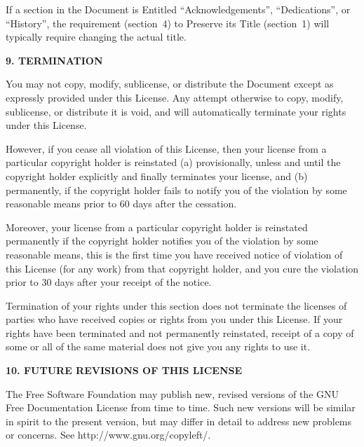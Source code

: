 \documentclass[twocolumn,twoside,fleqn,12pt]{article}
\begin{document}
If a section in the Document is Entitled ``Acknowledgements'',
``Dedications'', or ``History'', the requirement (section~4) to Preserve
its Title (section~1) will typically require changing the actual
title.


\begin{center}
{\normalsize\bf 9. TERMINATION\par}
\end{center}


You may not copy, modify, sublicense, or distribute the Document
except as expressly provided under this License.  Any attempt
otherwise to copy, modify, sublicense, or distribute it is void, and
will automatically terminate your rights under this License.

However, if you cease all violation of this License, then your license
from a particular copyright holder is reinstated (a) provisionally,
unless and until the copyright holder explicitly and finally
terminates your license, and (b) permanently, if the copyright holder
fails to notify you of the violation by some reasonable means prior to
60 days after the cessation.

Moreover, your license from a particular copyright holder is
reinstated permanently if the copyright holder notifies you of the
violation by some reasonable means, this is the first time you have
received notice of violation of this License (for any work) from that
copyright holder, and you cure the violation prior to 30 days after
your receipt of the notice.

Termination of your rights under this section does not terminate the
licenses of parties who have received copies or rights from you under
this License.  If your rights have been terminated and not permanently
reinstated, receipt of a copy of some or all of the same material does
not give you any rights to use it.


\begin{center}
{\normalsize\bf 10. FUTURE REVISIONS OF THIS LICENSE\par}
\end{center}


The Free Software Foundation may publish new, revised versions
of the GNU Free Documentation License from time to time.  Such new
versions will be similar in spirit to the present version, but may
differ in detail to address new problems or concerns.  See
http://www.gnu.org/copyleft/.
\end{document}
